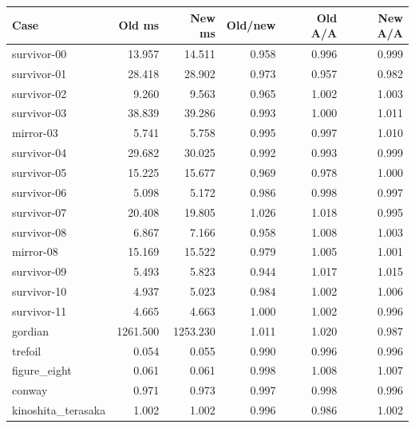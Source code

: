 \begin{center}\small
\begin{tabular}{lrrrrr}
\toprule
Case & Old ms & New ms & Old/new & Old A/A & New A/A \\
\midrule
survivor-00 & 13.957 & 14.511 & 0.958 & 0.996 & 0.999 \\
survivor-01 & 28.418 & 28.902 & 0.973 & 0.957 & 0.982 \\
survivor-02 & 9.260 & 9.563 & 0.965 & 1.002 & 1.003 \\
survivor-03 & 38.839 & 39.286 & 0.993 & 1.000 & 1.011 \\
mirror-03 & 5.741 & 5.758 & 0.995 & 0.997 & 1.010 \\
survivor-04 & 29.682 & 30.025 & 0.992 & 0.993 & 0.999 \\
survivor-05 & 15.225 & 15.677 & 0.969 & 0.978 & 1.000 \\
survivor-06 & 5.098 & 5.172 & 0.986 & 0.998 & 0.997 \\
survivor-07 & 20.408 & 19.805 & 1.026 & 1.018 & 0.995 \\
survivor-08 & 6.867 & 7.166 & 0.958 & 1.008 & 1.003 \\
mirror-08 & 15.169 & 15.522 & 0.979 & 1.005 & 1.001 \\
survivor-09 & 5.493 & 5.823 & 0.944 & 1.017 & 1.015 \\
survivor-10 & 4.937 & 5.023 & 0.984 & 1.002 & 1.006 \\
survivor-11 & 4.665 & 4.663 & 1.000 & 1.002 & 0.996 \\
gordian & 1261.500 & 1253.230 & 1.011 & 1.020 & 0.987 \\
trefoil & 0.054 & 0.055 & 0.990 & 0.996 & 0.996 \\
figure\_eight & 0.061 & 0.061 & 0.998 & 1.008 & 1.007 \\
conway & 0.971 & 0.973 & 0.997 & 0.998 & 0.996 \\
kinoshita\_terasaka & 1.002 & 1.002 & 0.996 & 0.986 & 1.002 \\
\bottomrule
\end{tabular}
\end{center}
